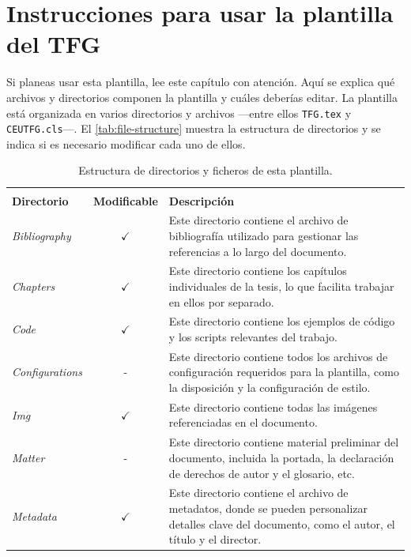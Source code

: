 \chapter[Instrucciones plantilla]{Instrucciones para usar la plantilla del TFG}
\label{cp:user-guide}

Si planeas usar esta plantilla, lee este capítulo con atención. Aquí se explica qué archivos y directorios componen la plantilla y cuáles deberías editar. La plantilla está organizada en varios directorios y archivos —entre ellos \texttt{TFG.tex} y \texttt{CEUTFG.cls}—. El \autoref{tab:file-structure} muestra la estructura de directorios y se indica si es necesario modificar cada uno de ellos.

\begin{table}[!htpb]
    \setlength{\extrarowheight}{2pt}
    \caption[Estructura de directorios y ficheros]{Estructura de directorios y ficheros de esta plantilla.}
    \label{tab:file-structure}
    \begin{tabularx}{\textwidth}{lcX}
        \toprule
        \\[-1.5\normalbaselineskip]
        \textbf{Directorio} & \textbf{Modificable} & \textbf{Descripción} \\ [0em]
        \midrule
        \textit{Bibliography} & $\checkmark$ & Este directorio contiene el archivo de bibliografía utilizado 
        para gestionar las referencias a lo largo del documento. \\
        \textit{Chapters} & $\checkmark$ & Este directorio contiene los capítulos individuales de la tesis, 
        lo que facilita trabajar en ellos por separado. \\
        \textit{Code} & $\checkmark$ & Este directorio contiene los ejemplos de código y los scripts relevantes del trabajo. \\
        \textit{Configurations} & - & Este directorio contiene todos los archivos de configuración requeridos 
        para la plantilla, como la disposición y la configuración de estilo. \\
        \textit{Img} & $\checkmark$ & Este directorio contiene todas las imágenes referenciadas en el documento. \\
        \textit{Matter} & - & Este directorio contiene material preliminar del documento, incluida la portada, 
        la declaración de derechos de autor y el glosario, etc. \\
        \textit{Metadata} & $\checkmark$ & Este directorio contiene el archivo de metadatos, donde se pueden 
        personalizar detalles clave del documento, como el autor, el título y el director. \\
        \bottomrule
    \end{tabularx}
\end{table}


